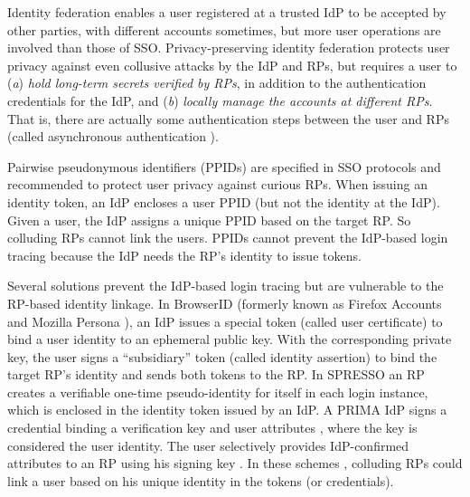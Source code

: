 Identity federation enables a user registered at a trusted IdP to be accepted by other parties,
            with different accounts sometimes,
        but more user operations are involved than those of SSO.
Privacy-preserving identity federation
    protects user privacy against even collusive attacks by the IdP and RPs,
    but requires a user \cite{ELPASSO,UnlimitID,hyperledge-idemix,PseudoID,Opaak,uprov} to (\emph{a}) \emph{hold long-term secrets verified by RPs},
            in addition to the authentication credentials for the IdP,
                and (\emph{b}) \emph{locally manage the accounts at different RPs}.
That is, there are actually some authentication steps between the user and RPs (called asynchronous authentication \cite{ELPASSO}).

Pairwise pseudonymous identifiers (PPIDs) are specified in SSO protocols \cite{OpenIDConnect, SAMLIdentifier} and recommended \cite{NIST2017draft}
to protect user privacy against curious RPs.
When issuing an identity token,
        an IdP encloses a user PPID (but not the identity at the IdP).
Given a user, the IdP assigns a unique PPID based on the target RP.
So colluding RPs cannot link the users.
PPIDs cannot prevent the IdP-based login tracing because the IdP needs the RP's identity to issue tokens.



Several solutions prevent the IdP-based login tracing but are vulnerable to the RP-based identity linkage.
In BrowserID \cite{BrowserID} (formerly known as Firefox Accounts \cite{FirefoxAccount} and Mozilla Persona \cite{persona}), an IdP %
issues a special token (called user certificate) to bind a user identity to an ephemeral public key.
With the corresponding private key, the user signs a ``subsidiary'' token (called identity assertion) to bind the target RP's identity and sends both tokens to the RP.
In SPRESSO \cite{SPRESSO} an RP creates a verifiable one-time pseudo-identity for itself in each login instance, which is enclosed in the identity token issued by an IdP. %
A PRIMA IdP signs a credential
 binding a verification key and user attributes \cite{prima}, where the key is considered the user identity.
The user selectively provides IdP-confirmed attributes to an RP using his signing key \cite{Oblivion}.
In these schemes \cite{BrowserID,SPRESSO,prima}, colluding RPs could link a user based on his unique identity in the tokens (or credentials).


